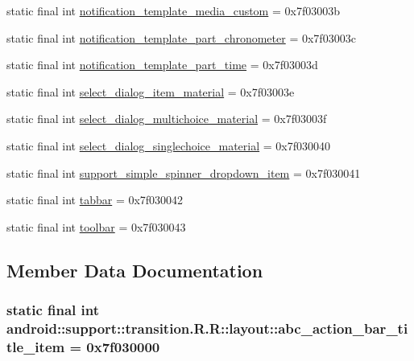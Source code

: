 \begin{CompactItemize}
\item 
static final int \hyperlink{classandroid_1_1support_1_1transition_1_1_r_1_1layout_efb5acb92e4d1ef333c084b281ed3d57}{notification\_\-template\_\-media\_\-custom} = 0x7f03003b
\item 
static final int \hyperlink{classandroid_1_1support_1_1transition_1_1_r_1_1layout_d6b58eac6a6d9547f29ce4117f56fa71}{notification\_\-template\_\-part\_\-chronometer} = 0x7f03003c
\item 
static final int \hyperlink{classandroid_1_1support_1_1transition_1_1_r_1_1layout_e6b29d8f6ce1eb734e38590a77ed1acd}{notification\_\-template\_\-part\_\-time} = 0x7f03003d
\item 
static final int \hyperlink{classandroid_1_1support_1_1transition_1_1_r_1_1layout_f68c054ea19bbb1d6e0304dee0e8f054}{select\_\-dialog\_\-item\_\-material} = 0x7f03003e
\item 
static final int \hyperlink{classandroid_1_1support_1_1transition_1_1_r_1_1layout_7d379b5ec6cd44a76bf4572e5f31d5af}{select\_\-dialog\_\-multichoice\_\-material} = 0x7f03003f
\item 
static final int \hyperlink{classandroid_1_1support_1_1transition_1_1_r_1_1layout_0f8d52df0bd83e09e08c53df96807fd4}{select\_\-dialog\_\-singlechoice\_\-material} = 0x7f030040
\item 
static final int \hyperlink{classandroid_1_1support_1_1transition_1_1_r_1_1layout_fe14d8b0ac281876fb1120099846c2bc}{support\_\-simple\_\-spinner\_\-dropdown\_\-item} = 0x7f030041
\item 
static final int \hyperlink{classandroid_1_1support_1_1transition_1_1_r_1_1layout_a67fd264800fcfac7e3a301aeb4b4c2e}{tabbar} = 0x7f030042
\item 
static final int \hyperlink{classandroid_1_1support_1_1transition_1_1_r_1_1layout_0836ba6a09ee14acf89c5ca05fd94533}{toolbar} = 0x7f030043
\end{CompactItemize}


\subsection{Member Data Documentation}
\hypertarget{classandroid_1_1support_1_1transition_1_1_r_1_1layout_a8e39688f86f85f54edfe0ea24318ba6}{
\subsubsection[{abc\_\-action\_\-bar\_\-title\_\-item}]{\setlength{\rightskip}{0pt plus 5cm}static final int android::support::transition.R.R::layout::abc\_\-action\_\-bar\_\-title\_\-item = 0x7f030000}}
\label{classandroid_1_1support_1_1transition_1_1_r_1_1layout_a8e39688f86f85f54edfe0ea24318ba6}


